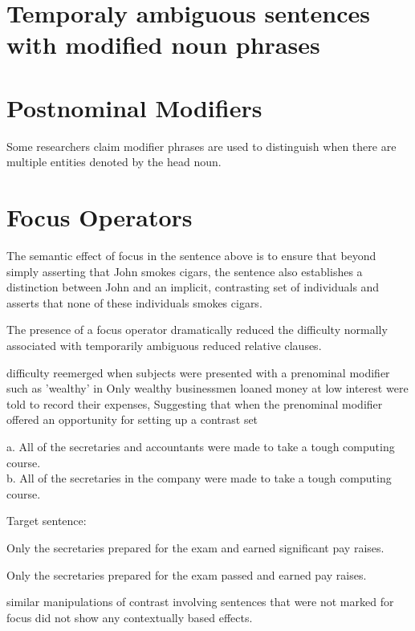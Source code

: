 \documentclass[12pt]{article}
\begin{document}
\section{Temporaly ambiguous sentences with modified noun phrases}

\section{Postnominal Modifiers}
Some researchers claim  modifier phrases are used to distinguish when there are multiple entities denoted by the head noun.

\section{Focus Operators}

The semantic effect of
focus in the sentence above is to ensure that beyond simply asserting that
John smokes cigars, the sentence also establishes a distinction between John
and an implicit, contrasting set of individuals and asserts that none of these
individuals smokes cigars.

The presence of a focus operator
dramatically reduced the difficulty normally associated with temporarily
ambiguous reduced relative clauses.

difficulty reemerged when subjects were presented with a prenominal modifier such as 'wealthy' in Only wealthy businessmen loaned money at
low interest were told to record their expenses, Suggesting that when the prenominal modifier offered an opportunity for setting up a contrast set

\begin{example}
 a. All of the secretaries and accountants were made to take a
tough computing course.\\
b. All of the secretaries in the company were made to take a tough
computing course.
\end{example}

\begin{example}Target sentence:\\
\item Only the secretaries prepared for the exam and earned significant
pay raises.
\item Only the secretaries prepared for the exam passed and earned pay
raises.
\end{example}

similar manipulations of contrast involving sentences that were not
marked for focus did not show any contextually based effects.
\end{document}
